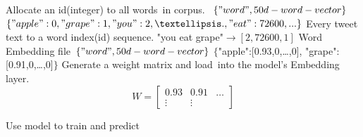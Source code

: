 \documentclass[11pt]{article}
\begin{document}
    \begin{algorithm}
        \caption{}
        \begin{algorithmic}[1] %
            \State Allocate an id(integer) to all words in corpus. 
            \State  $\{"word", 50d-word-vector\}$
            \State $\{"apple":0, "grape":1,"you":2,…., "eat":72600,...\}$
            \State Every tweet text to a word index(id) sequence.
            \State "you eat grape"$\rightarrow [2,72600,1]$
            \State Word Embedding file $\{"word", 50d-word-vector\}$
            \State $\{$"apple":[0.93,0,…,0], "grape":[0.91,0,…,0]$\}$
            \State Generate a weight matrix and load into the model's Embedding layer.
            \State \begin{equation}\nonumber
                W=\begin{bmatrix}
                0.93 & 0.91 & \hdots \\
                \vdots & \vdots
                \end{bmatrix}
                \end{equation}

\State Use model to train and predict

        \end{algorithmic}
    \end{algorithm}
\end{document}
